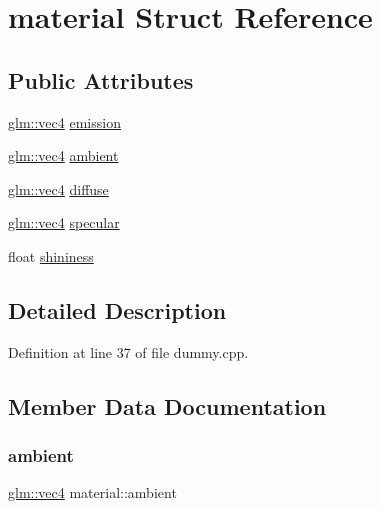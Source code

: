 \hypertarget{structmaterial}{}\section{material Struct Reference}
\label{structmaterial}
\subsection*{Public Attributes}
\begin{DoxyCompactItemize}
\item 
\hyperlink{group__core__types_ga5881b1b022d7fd1b7218f5916532dd02}{glm\+::vec4} \hyperlink{structmaterial_a76b696726a2ea73e6840001821942bc3}{emission}
\item 
\hyperlink{group__core__types_ga5881b1b022d7fd1b7218f5916532dd02}{glm\+::vec4} \hyperlink{structmaterial_a944296102e90b1610967530458f40ba1}{ambient}
\item 
\hyperlink{group__core__types_ga5881b1b022d7fd1b7218f5916532dd02}{glm\+::vec4} \hyperlink{structmaterial_a506a0cc33282fa76872c6aeebd688b39}{diffuse}
\item 
\hyperlink{group__core__types_ga5881b1b022d7fd1b7218f5916532dd02}{glm\+::vec4} \hyperlink{structmaterial_a452d07b4570da7204caeaf798cd01a77}{specular}
\item 
float \hyperlink{structmaterial_aa3740fd7908ec5a11bbc4a4bd5b21abc}{shininess}
\end{DoxyCompactItemize}


\subsection{Detailed Description}


Definition at line 37 of file dummy.\+cpp.



\subsection{Member Data Documentation}
\mbox{\label{structmaterial_a944296102e90b1610967530458f40ba1}} 
\subsubsection{\texorpdfstring{ambient}{ambient}}
{\footnotesize\ttfamily \hyperlink{group__core__types_ga5881b1b022d7fd1b7218f5916532dd02}{glm\+::vec4} material\+::ambient}



